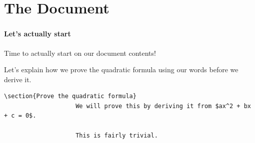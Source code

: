 \documentclass{beamer}
\begin{document}
	\section{The Document}
	\begin{frame}[fragile]
		\frametitle{\secname}
		\framesubtitle{Let's actually start}
		Time to actually start on our document contents!

		Let's explain how we prove the quadratic formula using our words before we derive it.
		\begin{example}
			\begin{lstlisting}[numbers=none, gobble=16]
				\section{Prove the quadratic formula}
					We will prove this by deriving it from $ax^2 + bx + c = 0$.

					This is fairly trivial.
			\end{lstlisting}
		\end{example}
	\end{frame}
\end{document}
